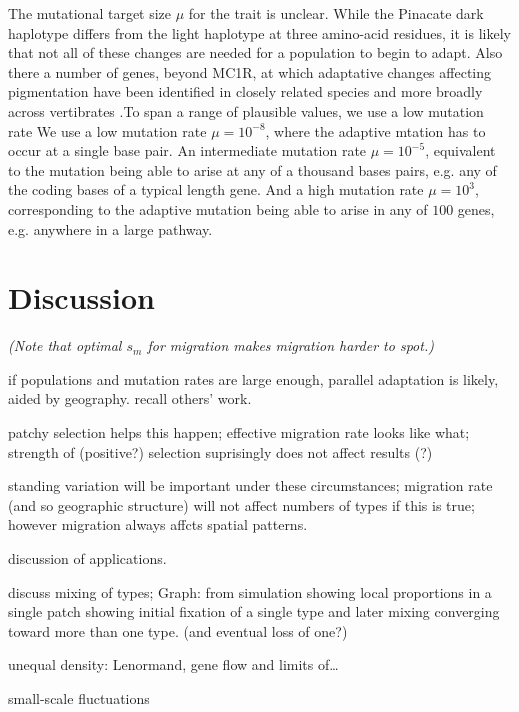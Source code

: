 \documentclass{article}
\newcommand{\plr}[1]{{\it\color{blue}(#1)}}
\begin{document}
The mutational target size $\mu$ for the trait is unclear. 
While the Pinacate dark haplotype differs from the light haplotype at three amino-acid residues,
it is likely that not all of these changes are needed for a population to begin to  
adapt. Also there a number of genes, beyond MC1R, at which adaptative changes affecting 
pigmentation have been identified in closely related species and more
broadly across vertibrates \citep{}.To span a range of plausible
values, we use a low mutation rate 
We use a low mutation rate $\mu= 10^{-8}$, where the adaptive
mtation has to occur at a single base pair.
An intermediate mutation rate $\mu= 10^{-5}$, equivalent to
the mutation being able to arise at any of a thousand bases pairs,
e.g. any of the coding bases of a typical length gene. And a high
mutation rate $\mu = 10^{3}$, corresponding to the adaptive mutation
being able to arise in any of $100$ genes, e.g. anywhere in a large pathway. 



\section{Discussion} 

\plr{Note that optimal $s_m$ for migration makes migration harder to spot.}

if populations and mutation rates are large enough, parallel adaptation is likely, aided by geography. 
recall others' work. 

patchy selection helps this happen; 
effective migration rate looks like what; 
strength of (positive?) selection suprisingly does not affect results (?) 

standing variation will be important under these circumstances; 
migration rate (and so geographic structure) will not affect numbers of types if this is true; 
however migration always affcts spatial patterns. 

discussion of applications. 

discuss mixing of types; 
Graph: from simulation showing local proportions in a single patch showing initial fixation of a single type and later mixing converging toward more than one type.  (and eventual loss of one?)

unequal density: Lenormand, gene flow and limits of\dots

small-scale fluctuations



\appendix
\end{document}
